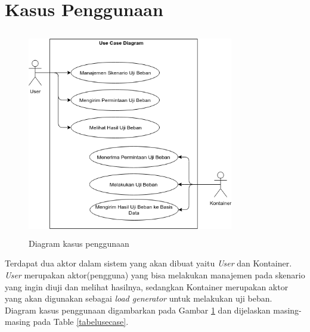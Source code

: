     \section{Kasus Penggunaan}
	    \begin{figure}[H]
	    	\centering
	    	\includegraphics[width=9cm,height=9cm]{Images/C-3/usecasediagram.png}
	    	\caption{Diagram kasus penggunaan}
	    	\label{usecased}
	    \end{figure}
    	Terdapat dua aktor dalam sistem yang akan dibuat yaitu \textit{User} dan Kontainer. \textit{User} merupakan aktor(pengguna) yang bisa melakukan manajemen pada skenario yang ingin diuji dan melihat hasilnya, sedangkan Kontainer merupakan aktor yang akan digunakan sebagai \textit{load generator} untuk melakukan uji beban. Diagram kasus penggunaan digambarkan pada Gambar \ref{usecased} dan dijelaskan masing-masing pada Table \ref{tabelusecase}.
    	
